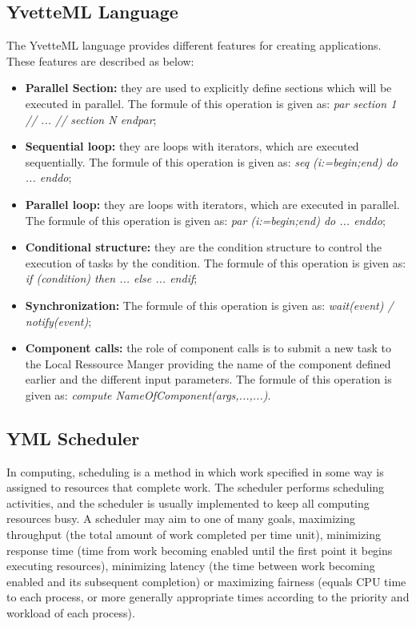 \subsection{YvetteML Language}

The YvetteML language provides different features for creating applications. These features are described as below:

\begin{itemize}
	\item \textbf{Parallel Section:} they are used to explicitly define sections which will be executed in parallel. The formule of this operation is given as: \textit{par section 1 // ... // section N endpar};
	\item \textbf{Sequential loop:} they are loops with iterators, which are executed sequentially. The formule of this operation is given as: \textit{seq (i:=begin;end) do ... enddo};
	\item \textbf{Parallel loop:} they are loops with iterators, which are executed in parallel. The formule of this operation is given as: \textit{par (i:=begin;end) do ... enddo};
	\item \textbf{Conditional structure:} they are the condition structure to control the execution of tasks by the condition. The formule of this operation is given as: \textit{if (condition) then ... else ... endif};
	\item \textbf{Synchronization:} The formule of this operation is given as: \textit{wait(event) / notify(event)};
	\item \textbf{Component calls:} the role of component calls is to submit a new task to the Local Ressource Manger providing the name of the component defined earlier and the different input parameters. The formule of this operation is given as: \textit{compute NameOfComponent(args,...,...)}.
\end{itemize}

\subsection{YML Scheduler}

In computing, scheduling is a method in which work specified in some way is assigned to resources that complete work. The scheduler performs scheduling activities, and the scheduler is usually implemented to keep all computing resources busy. A scheduler may aim to one of many goals, maximizing throughput (the total amount of work completed per time unit), minimizing response time (time from work becoming enabled until the first point it begins executing resources), minimizing latency (the time between work becoming enabled and its subsequent completion) or maximizing fairness (equals CPU time to each process, or more generally appropriate times according to the priority and workload of each process).

